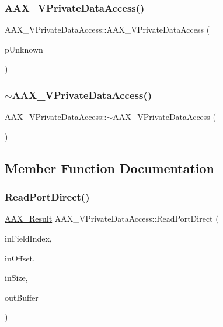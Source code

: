 \subsubsection{\texorpdfstring{AAX\_VPrivateDataAccess()}{AAX\_VPrivateDataAccess()}}
{\footnotesize\ttfamily A\+A\+X\+\_\+\+V\+Private\+Data\+Access\+::\+A\+A\+X\+\_\+\+V\+Private\+Data\+Access (\begin{DoxyParamCaption}\item[{\mbox{\hyperlink{a01409}{I\+A\+C\+F\+Unknown}} $\ast$}]{p\+Unknown }\end{DoxyParamCaption})}

\mbox{\label{a01933_aac49bbafb2d49448384163adc2643192}} 
\subsubsection{\texorpdfstring{$\sim$AAX\_VPrivateDataAccess()}{~AAX\_VPrivateDataAccess()}}
{\footnotesize\ttfamily A\+A\+X\+\_\+\+V\+Private\+Data\+Access\+::$\sim$\+A\+A\+X\+\_\+\+V\+Private\+Data\+Access (\begin{DoxyParamCaption}{ }\end{DoxyParamCaption})}



\subsection{Member Function Documentation}
\mbox{\label{a01933_a7feff5ff4cfb64e5b87b4c94d2f8f6f6}} 
\subsubsection{\texorpdfstring{ReadPortDirect()}{ReadPortDirect()}}
{\footnotesize\ttfamily \mbox{\hyperlink{a00392_a4d8f69a697df7f70c3a8e9b8ee130d2f}{A\+A\+X\+\_\+\+Result}} A\+A\+X\+\_\+\+V\+Private\+Data\+Access\+::\+Read\+Port\+Direct (\begin{DoxyParamCaption}\item[{\mbox{\hyperlink{a00392_ae807f8986143820cfb5d6da32165c9c7}{A\+A\+X\+\_\+\+C\+Field\+Index}}}]{in\+Field\+Index,  }\item[{const uint32\+\_\+t}]{in\+Offset,  }\item[{const uint32\+\_\+t}]{in\+Size,  }\item[{void $\ast$}]{out\+Buffer }\end{DoxyParamCaption})\hspace{0.3cm}{\ttfamily [virtual]}}



